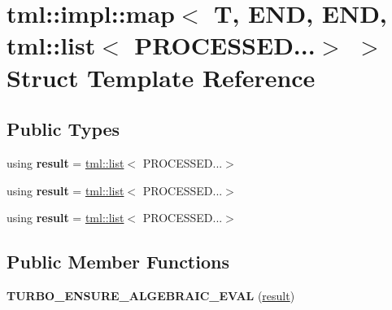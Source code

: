 \hypertarget{structtml_1_1impl_1_1map_3_01T_00_01END_00_01END_00_01tml_1_1list_3_01PROCESSED_8_8_8_4_01_4}{\section{tml\+:\+:impl\+:\+:map$<$ T, E\+N\+D, E\+N\+D, tml\+:\+:list$<$ P\+R\+O\+C\+E\+S\+S\+E\+D...$>$ $>$ Struct Template Reference}
\label{structtml_1_1impl_1_1map_3_01T_00_01END_00_01END_00_01tml_1_1list_3_01PROCESSED_8_8_8_4_01_4}
}
\subsection*{Public Types}
\begin{DoxyCompactItemize}
\item 
\hypertarget{structtml_1_1impl_1_1map_3_01T_00_01END_00_01END_00_01tml_1_1list_3_01PROCESSED_8_8_8_4_01_4_a46679d9f0a45ffda062e1e459ec13cc8}{using {\bfseries result} = \hyperlink{structtml_1_1list}{tml\+::list}$<$ P\+R\+O\+C\+E\+S\+S\+E\+D...$>$}\label{structtml_1_1impl_1_1map_3_01T_00_01END_00_01END_00_01tml_1_1list_3_01PROCESSED_8_8_8_4_01_4_a46679d9f0a45ffda062e1e459ec13cc8}

\item 
\hypertarget{structtml_1_1impl_1_1map_3_01T_00_01END_00_01END_00_01tml_1_1list_3_01PROCESSED_8_8_8_4_01_4_a46679d9f0a45ffda062e1e459ec13cc8}{using {\bfseries result} = \hyperlink{structtml_1_1list}{tml\+::list}$<$ P\+R\+O\+C\+E\+S\+S\+E\+D...$>$}\label{structtml_1_1impl_1_1map_3_01T_00_01END_00_01END_00_01tml_1_1list_3_01PROCESSED_8_8_8_4_01_4_a46679d9f0a45ffda062e1e459ec13cc8}

\item 
\hypertarget{structtml_1_1impl_1_1map_3_01T_00_01END_00_01END_00_01tml_1_1list_3_01PROCESSED_8_8_8_4_01_4_a46679d9f0a45ffda062e1e459ec13cc8}{using {\bfseries result} = \hyperlink{structtml_1_1list}{tml\+::list}$<$ P\+R\+O\+C\+E\+S\+S\+E\+D...$>$}\label{structtml_1_1impl_1_1map_3_01T_00_01END_00_01END_00_01tml_1_1list_3_01PROCESSED_8_8_8_4_01_4_a46679d9f0a45ffda062e1e459ec13cc8}

\end{DoxyCompactItemize}
\subsection*{Public Member Functions}
\begin{DoxyCompactItemize}
\item 
\hypertarget{structtml_1_1impl_1_1map_3_01T_00_01END_00_01END_00_01tml_1_1list_3_01PROCESSED_8_8_8_4_01_4_affd891d9b2abdc82e6a671a1f61c5ccd}{{\bfseries T\+U\+R\+B\+O\+\_\+\+E\+N\+S\+U\+R\+E\+\_\+\+A\+L\+G\+E\+B\+R\+A\+I\+C\+\_\+\+E\+V\+A\+L} (\hyperlink{structtml_1_1list}{result})}\label{structtml_1_1impl_1_1map_3_01T_00_01END_00_01END_00_01tml_1_1list_3_01PROCESSED_8_8_8_4_01_4_affd891d9b2abdc82e6a671a1f61c5ccd}

\end{DoxyCompactItemize}



